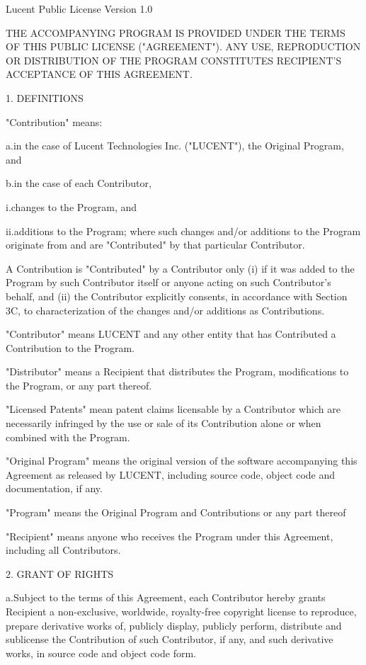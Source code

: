 Lucent Public License Version 1.0

THE ACCOMPANYING PROGRAM IS PROVIDED UNDER THE TERMS OF THIS PUBLIC
LICENSE ("AGREEMENT"). ANY USE, REPRODUCTION OR DISTRIBUTION OF THE
PROGRAM CONSTITUTES RECIPIENT'S ACCEPTANCE OF THIS AGREEMENT.

1. DEFINITIONS 

"Contribution" means: 

a.in the case of Lucent Technologies Inc. ("LUCENT"), the Original
Program, and

b.in the case of each Contributor, 

i.changes to the Program, and 

ii.additions to the Program; where such changes and/or additions to
the Program originate from and are "Contributed" by that particular
Contributor.

A Contribution is "Contributed" by a Contributor only (i) if it was
added to the Program by such Contributor itself or anyone acting on
such Contributor's behalf, and (ii) the Contributor explicitly
consents, in accordance with Section 3C, to characterization of the
changes and/or additions as Contributions. 

"Contributor" means LUCENT and any other entity that has Contributed a
Contribution to the Program.

"Distributor" means a Recipient that distributes the Program,
modifications to the Program, or any part thereof. 

"Licensed Patents" mean patent claims licensable by a Contributor
which are necessarily infringed by the use or sale of its Contribution
alone or when combined with the Program. 

"Original Program" means the original version of the software
accompanying this Agreement as released by LUCENT, including source
code, object code and documentation, if any.

"Program" means the Original Program and Contributions or any part
thereof 

"Recipient" means anyone who receives the Program under this
Agreement, including all Contributors. 

2. GRANT OF RIGHTS 

a.Subject to the terms of this Agreement, each Contributor hereby
grants Recipient a non-exclusive, worldwide, royalty-free copyright
license to reproduce, prepare derivative works of, publicly display,
publicly perform, distribute and sublicense the Contribution of such
Contributor, if any, and such derivative works, in source code and
object code form. 

